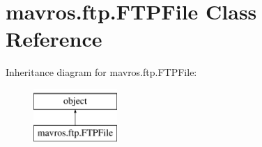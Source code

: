 \hypertarget{classmavros_1_1ftp_1_1FTPFile}{}\section{mavros.\+ftp.\+F\+T\+P\+File Class Reference}
\label{classmavros_1_1ftp_1_1FTPFile}
Inheritance diagram for mavros.\+ftp.\+F\+T\+P\+File\+:\begin{figure}[H]
\begin{center}
\leavevmode
\includegraphics[height=2.000000cm]{classmavros_1_1ftp_1_1FTPFile}
\end{center}
\end{figure}

